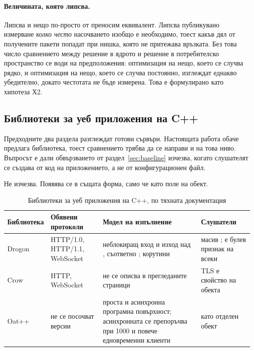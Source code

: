 \paragraph{Величината, която липсва.} Липсва и нещо по-просто от преносим еквивалент. Липсва
публикувано измерване \emph{колко често} насочването изобщо е необходимо, тоест какъв дял от
получените пакети попадат при нишка, която не притежава връзката. Без това число сравнението
между решение в ядрото и решение в потребителско пространство се води на предположения:
оптимизация на нещо, което се случва рядко, и оптимизация на нещо, което се случва постоянно,
изглеждат еднакво убедително, докато честотата не бъде измерена. Това е формулирано като
хипотеза Х2.

\subsection{Библиотеки за уеб приложения на C++}

\label{sec:libraries}

Предходните два раздела разглеждат готови сървъри. Настоящата работа обаче предлага
библиотека, тоест сравнението трябва да се направи и на това ниво. Въпросът е дали
обвързването от раздел~\ref{sec:baseline} изчезва, когато слушателят се създава от код на
приложението, а не от конфигурационен файл.

Не изчезва. Появява се в същата форма, само че като поле на обект.

\begin{table}[H]
\centering
\caption{Библиотеки за уеб приложения на C++, по тяхната документация}
\label{tab:cpp-libraries}
\begin{tabular}{@{}L{2.6cm}L{3.6cm}L{3.8cm}L{4.0cm}@{}}
\toprule
\textbf{Библио\-тека} & \textbf{Обявени протоколи} & \textbf{Модел на изпълнение} &
\textbf{Слушатели} \\
\midrule
Drogon & HTTP/1.0, HTTP/1.1, WebSocket \cite{drogon} & неблокиращ вход и изход над
, съответно ; корутини \cite{drogon} & масив ;
 е булев признак на всеки \cite{drogonconfig} \\
Crow & HTTP, WebSocket \cite{crow} & не се описва в прегледаните страници & TLS е свойство на
обекта  \cite{crowssl} \\
Oat++ & не се посочват версии \cite{oatpp} & проста и асинхронна програмна повърхност;
асинхронната се препоръчва при 1000 и повече едновременни клиенти \cite{oatppapi} &
 като отделен обект \cite{oatpp} \\
\bottomrule
\end{tabular}
\end{table}

